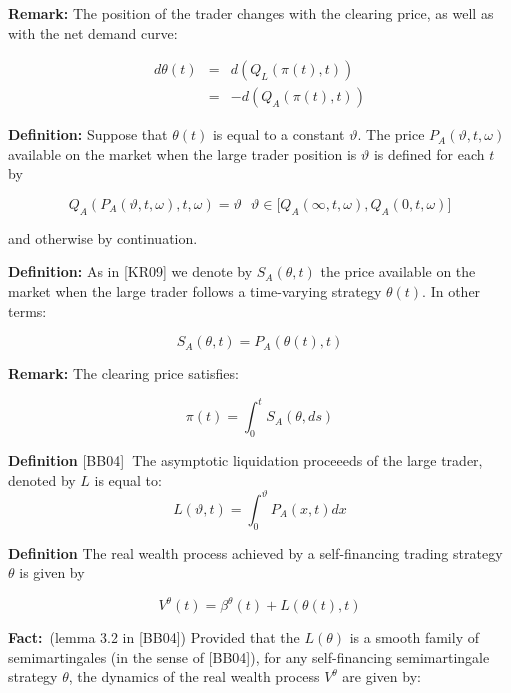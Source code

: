 \documentclass{article}
\begin{document}
\bigskip

\textbf{Remark: }The position of the trader changes with the clearing price,
as well as with the net demand curve:

\begin{eqnarray}
d\theta (t) &=&d(Q_{L}(\pi (t),t))  \label{theta_1} \\
&=&-d(Q_{A}(\pi (t),t))  \label{theta_2}
\end{eqnarray}

\textbf{Definition: }Suppose that $\theta (t)$ is equal to a constant $%
\vartheta $. The price $P_{A}(\vartheta ,t,\omega )$ available on the market
when the large trader position is $\vartheta $ is defined for each $t$ by

\begin{equation*}
Q_{A}(P_{A}(\vartheta ,t,\omega ),t,\omega )=\vartheta \text{ \ \ }\vartheta
\in \lbrack Q_{A}(\infty ,t,\omega ),Q_{A}(0,t,\omega )]
\end{equation*}

and otherwise by continuation.

\textbf{Definition:} As in [KR09] we denote by $S_{A}(\theta ,t)$ the price
available on the market when the large trader follows a time-varying
strategy $\theta (t)$. In other terms:

\begin{equation*}
S_{A}(\theta ,t)=P_{A}(\theta (t),t)
\end{equation*}

\textbf{Remark: }The clearing price satisfies:

\begin{equation*}
\pi (t)=\int_{0}^{t}S_{A}(\theta ,ds)
\end{equation*}

\textbf{Definition }[BB04]\textbf{\ }The asymptotic liquidation proceeeds of
the large trader, denoted by $L$ is equal to:\ 
\begin{equation*}
L(\vartheta ,t)=\int_{0}^{\vartheta }P_{A}(x,t)dx
\end{equation*}

\textbf{Definition} The real wealth process achieved by a self-financing
trading strategy $\theta $ is given by

\begin{equation*}
V^{\theta }(t)=\beta ^{\theta }(t)+L(\theta (t),t)
\end{equation*}

\textbf{Fact:}\ (lemma 3.2 in [BB04]) Provided that the $L(\theta )$ is a
smooth family of semimartingales (in the sense of [BB04]), for any
self-financing semimartingale strategy $\theta $, the dynamics of the real
wealth process $V^{\theta }$ are given by:
\end{document}
